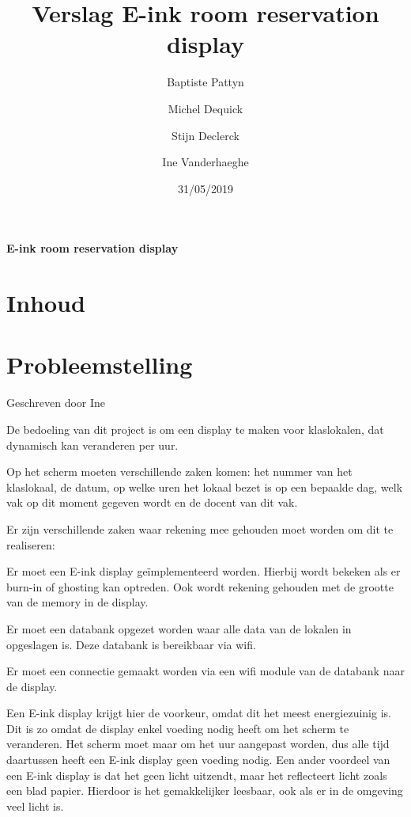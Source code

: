 \documentclass[a4paper,kul]{kulakarticle} %
\date{31/05/2019}
\title{Verslag E-ink room reservation display}
\author{Baptiste Pattyn\and Michel Dequick \and Stijn Declerck \and Ine Vanderhaeghe}
\begin{document}
\maketitle

\begin{center}
	\centering
	\vspace*{\fill}
	\huge
	\textbf{E-ink room reservation display}
	\vspace*{\fill}
\end{center}

\newpage

\section{Inhoud}

\tableofcontents

\newpage

\section{Probleemstelling}
{\scriptsize Geschreven door Ine}
\newline

De bedoeling van dit project is om een display te maken voor klaslokalen, dat dynamisch kan veranderen per uur. 

Op het scherm moeten verschillende zaken komen: het nummer van het klaslokaal, de datum, op welke uren het lokaal bezet is op een bepaalde dag, welk vak op dit moment gegeven wordt en de docent van dit vak.
\newline

Er zijn verschillende zaken waar rekening mee gehouden moet worden om dit te realiseren:

Er moet een E-ink display geïmplementeerd worden. Hierbij wordt bekeken als er burn-in of ghosting kan optreden. Ook wordt rekening gehouden met de grootte van de memory in de display.

Er moet een databank opgezet worden waar alle data van de lokalen in opgeslagen is. Deze databank is bereikbaar via wifi.

Er moet een connectie gemaakt worden via een wifi module van de databank naar de display.
\newline

Een E-ink display krijgt hier de voorkeur, omdat dit het meest energiezuinig is. Dit is zo omdat de display enkel voeding nodig heeft om het scherm te veranderen. Het scherm moet maar om het uur aangepast worden, dus alle tijd daartussen heeft een E-ink display geen voeding nodig.
Een ander voordeel van een E-ink display is dat het geen licht uitzendt, maar het reflecteert licht zoals een blad papier. Hierdoor is het gemakkelijker leesbaar, ook als er in de omgeving veel licht is. 
\newline
\end{document}
